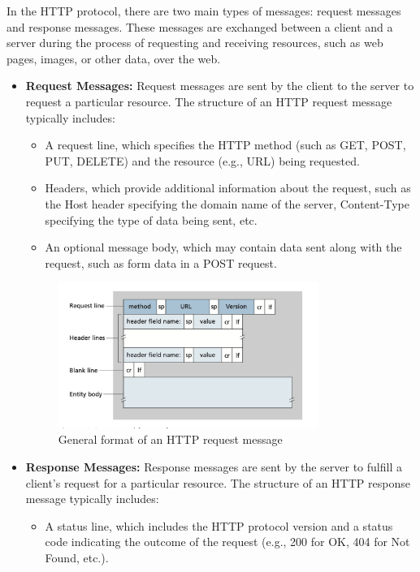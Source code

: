 \documentclass[11pt]{article}
\begin{document}
In the HTTP protocol, there are two main types of messages: request messages and response messages. These messages are exchanged between a client and a server during the process of requesting and receiving resources, such as web pages, images, or other data, over the web.

\begin{itemize}
    \item \textbf{Request Messages:} Request messages are sent by the client to the server to request a particular resource. The structure of an HTTP request message typically includes:
    \begin{itemize}
        \item A request line, which specifies the HTTP method (such as GET, POST, PUT, DELETE) and the resource (e.g., URL) being requested.
        \item Headers, which provide additional information about the request, such as the Host header specifying the domain name of the server, Content-Type specifying the type of data being sent, etc.
        \item An optional message body, which may contain data sent along with the request, such as form data in a POST request.
    \end{itemize}
    \begin{figure}
        \centering
        \includegraphics[width=0.8\textwidth]{req.png}
        \caption{General format of an HTTP request message}
        \label{fig:request_message}
    \end{figure}
    \item \textbf{Response Messages:} Response messages are sent by the server to fulfill a client's request for a particular resource. The structure of an HTTP response message typically includes:
    \begin{itemize}
        \item A status line, which includes the HTTP protocol version and a status code indicating the outcome of the request (e.g., 200 for OK, 404 for Not Found, etc.).

\end{itemize}
\end{itemize}
\end{document}
